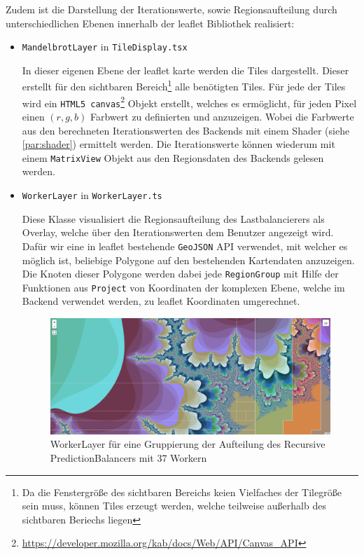Zudem ist die Darstellung der Iterationswerte, sowie Regionsaufteilung durch unterschiedlichen Ebenen innerhalb der
leaflet Bibliothek realisiert:

\begin{itemize}
	\item \verb|MandelbrotLayer| in \verb|TileDisplay.tsx|

	      In dieser eigenen Ebene der leaflet karte werden die Tiles dargestellt.
	      Dieser erstellt für den sichtbaren Bereich\footnote{
		      Da die Fenstergröße des sichtbaren Bereichs keien Vielfaches der Tilegröße sein muss,
		      können Tiles erzeugt werden, welche teilweise außerhalb des sichtbaren Beriechs liegen}
	      alle benötigten Tiles. Für jede der Tiles wird ein \verb|HTML5 canvas|\footnote{\url{https://developer.mozilla.org/kab/docs/Web/API/Canvas_API}} Objekt erstellt, welches es
	      ermöglicht, für jeden Pixel einen \( (r,g,b) \) Farbwert zu definierten und anzuzeigen. Wobei die Farbwerte aus den berechneten
	      Iterationswerten des Backends mit einem Shader (siehe \autoref{par:shader}) ermittelt werden. Die Iterationswerte können wiederum
	      mit einem \verb|MatrixView| Objekt aus den Regionsdaten des Backends gelesen werden.

	\item \verb|WorkerLayer| in \verb|WorkerLayer.ts|\label{par:workerLayer}

	      Diese Klasse visualisiert die Regionsaufteilung des Lastbalancierers als Overlay, welche über den Iterationswerten
	      dem Benutzer angezeigt wird.
	      Dafür wir eine in leaflet bestehende \verb|GeoJSON| API verwendet, mit welcher es möglich
	      ist, beliebige Polygone auf den bestehenden Kartendaten anzuzeigen. Die Knoten dieser Polygone werden dabei jede \verb|RegionGroup|
	      mit Hilfe der Funktionen aus \verb|Project| von Koordinaten der komplexen Ebene, welche im Backend verwendet werden, zu
	      leaflet Koordinaten umgerechnet.

	      \begin{figure}
		      \centering
		      \includegraphics[width=.85\linewidth]{img/Implementierung/regionGrouping}
		      \caption{WorkerLayer für eine Gruppierung der Aufteilung des Recursive PredictionBalancers mit 37 Workern}
		      \label{fig:regionGrouping}
	      \end{figure}


\end{itemize}
